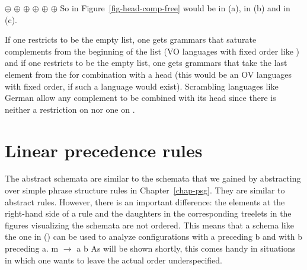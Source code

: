 \eal
\ex \eliste{} $\oplus$  $\oplus$  
\ex {} $\oplus$  $\oplus$  
\ex {} $\oplus$  $\oplus$ \eliste 
\zl
So  in Figure~\ref{fig-head-comp-free} would be \npnom in (a), \npdat in (b) and \npacc in (c).

If one restricts  to be the
empty list, one gets grammars that saturate complements from the beginning of the list (VO languages
with fixed order like ) and if one restricts  to be the empty list, one gets grammars that take the last
element from the \compsl for combination with a head (this would be an OV languages with fixed
order, if such a language would exist). Scrambling languages like German allow any
complement to be combined with its head since there is neither a restriction on  nor one on .






\section{Linear precedence rules}
\label{sec-lp-rules}

The abstract schemata are similar to the schemata that we gained by abstracting over simple phrase
structure rules in Chapter~\ref{chap-psg}. They are similar to abstract \xbar rules. However, there
is an important difference: the elements at the right-hand side of a rule and the daughters in the
corresponding treelets in the figures visualizing the schemata are not ordered. This means that a
schema like the one in () can be used to analyze configurations with a preceding b and with
b preceding a.
\ea
m $\to$ a b
\z
As will be shown shortly, this comes handy in situations in which one wants to leave the actual
order underspecified.

